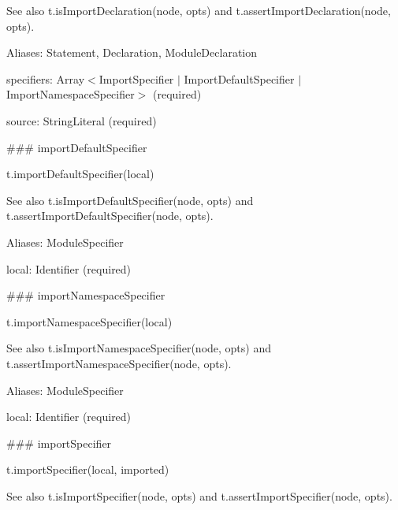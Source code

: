 See also {\ttfamily t.\+is\+Import\+Declaration(node, opts)} and {\ttfamily t.\+assert\+Import\+Declaration(node, opts)}.

Aliases\+: {\ttfamily Statement}, {\ttfamily Declaration}, {\ttfamily Module\+Declaration}


\begin{DoxyItemize}
\item {\ttfamily specifiers}\+: {\ttfamily Array$<$Import\+Specifier $\vert$ Import\+Default\+Specifier $\vert$ Import\+Namespace\+Specifier$>$} (required)
\item {\ttfamily source}\+: {\ttfamily String\+Literal} (required) 


\end{DoxyItemize}

\#\#\# import\+Default\+Specifier 
\begin{DoxyCode}
t.importDefaultSpecifier(local)
\end{DoxyCode}


See also {\ttfamily t.\+is\+Import\+Default\+Specifier(node, opts)} and {\ttfamily t.\+assert\+Import\+Default\+Specifier(node, opts)}.

Aliases\+: {\ttfamily Module\+Specifier}


\begin{DoxyItemize}
\item {\ttfamily local}\+: {\ttfamily Identifier} (required) 


\end{DoxyItemize}

\#\#\# import\+Namespace\+Specifier 
\begin{DoxyCode}
t.importNamespaceSpecifier(local)
\end{DoxyCode}


See also {\ttfamily t.\+is\+Import\+Namespace\+Specifier(node, opts)} and {\ttfamily t.\+assert\+Import\+Namespace\+Specifier(node, opts)}.

Aliases\+: {\ttfamily Module\+Specifier}


\begin{DoxyItemize}
\item {\ttfamily local}\+: {\ttfamily Identifier} (required) 


\end{DoxyItemize}

\#\#\# import\+Specifier 
\begin{DoxyCode}
t.importSpecifier(local, imported)
\end{DoxyCode}


See also {\ttfamily t.\+is\+Import\+Specifier(node, opts)} and {\ttfamily t.\+assert\+Import\+Specifier(node, opts)}.

